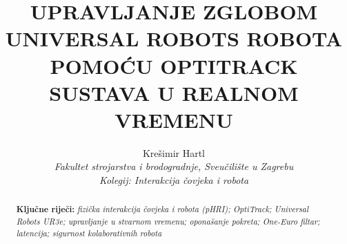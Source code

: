 \documentclass[10pt,a4paper,twocolumn]{article}
\title{%
    \vspace{-1.5cm}%
    {\fontsize{16pt}{19pt}\selectfont\bfseries\MakeUppercase{Upravljanje zglobom Universal Robots robota pomoću OptiTrack sustava u realnom vremenu}}%
    \vspace{0.3cm}%
}
\author{%
    {\fontsize{12pt}{14pt}\selectfont Krešimir Hartl}\\[2pt]
    {\small\textit{Fakultet strojarstva i brodogradnje, Sveučilište u Zagrebu}}\\[2pt]
    {\small\textit{Kolegij: Interakcija čovjeka i robota}}%
}
\date{}
\begin{document}
\maketitle
\thispagestyle{fancy}

\begin{abstract}
\noindent 

\vspace{0.3cm}
\noindent \textbf{Ključne riječi:} \emph{fizička interakcija čovjeka i robota (pHRI); OptiTrack; Universal Robots UR3e; upravljanje u stvarnom vremenu; oponašanje pokreta; One-Euro filtar; latencija; sigurnost kolaborativnih robota}
\end{abstract}

\vspace{0.5cm}










\end{document}
